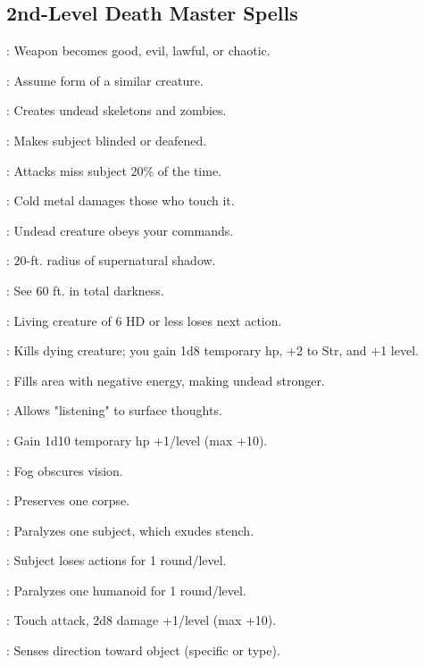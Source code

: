 \begin{multicols}{2}
\subsection{2nd-Level Death Master Spells}
\begin{description*}
\item[\linkspell{Align Weapon}:] Weapon becomes good, evil, lawful, or chaotic.
\item[\linkspell{Alter Self}:] Assume form of a similar creature.
\item[\linkspell{Animate Dead}:] Creates undead skeletons and zombies.
\item[\linkspell{Blindness/Deafness}:] Makes subject blinded or deafened.
\item[\linkspell{Blur}:] Attacks miss subject 20\% of the time.
\item[\linkspell{Chill Metal}:] Cold metal damages those who touch it.
\item[\linkspell{Command Undead}:] Undead creature obeys your commands.
\item[\linkspell{Darkness}:] 20-ft. radius of supernatural shadow.
\item[\linkspell{Darkvision}:] See 60 ft. in total darkness.
\item[\linkspell{Daze Monster}:] Living creature of 6 HD or less loses next action.
\item[\linkspell{Death Knell}:] Kills dying creature; you gain 1d8 temporary hp, +2 to Str, and +1 level.
\item[\linkspell{Desecrate}:] Fills area with negative energy, making undead stronger.
\item[\linkspell{Detect Thoughts}:] Allows "listening" to surface thoughts.
\item[\linkspell{False Life}:] Gain 1d10 temporary hp +1/level (max +10).
\item[\linkspell{Fog Cloud}:] Fog obscures vision.
\item[\linkspell{Gentle Repose}:] Preserves one corpse.
\item[\linkspell{Ghoul Touch}:] Paralyzes one subject, which exudes stench.
\item[\linkspell{Hideous Laughter}:] Subject loses actions for 1 round/level.
\item[\linkspell{Hold Person}:] Paralyzes one humanoid for 1 round/level.
\item[\linkspell{Inflict Moderate Wounds}:] Touch attack, 2d8 damage +1/level (max +10).
\item[\linkspell{Locate Object}:] Senses direction toward object (specific or type).

\end{description*}
\end{multicols}
